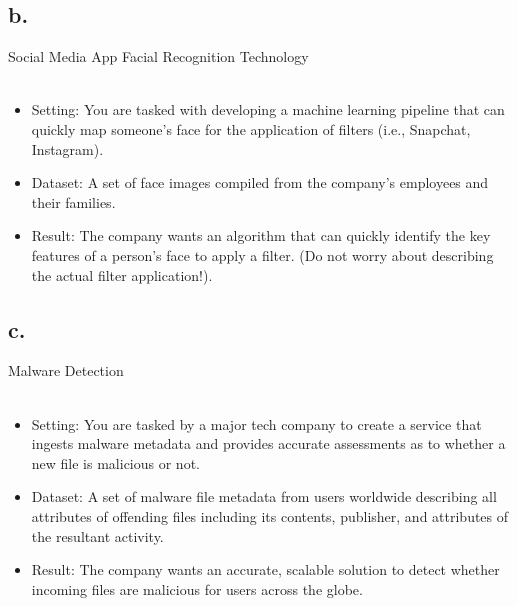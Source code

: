 \documentclass{article}
\newcommand{\1}{\mathbf{1}}
\begin{document}
{\subsection*{b.}

Social Media App Facial Recognition Technology \\ \\
\begin{itemize}
    \item Setting: You are tasked with developing a machine learning pipeline that can quickly map someone’s face for the application of filters (i.e., Snapchat, Instagram).
    \item Dataset: A set of face images compiled from the company’s employees and their families.
    \item  Result: The company wants an algorithm that can quickly identify the key features of a person’s face to apply a filter. (Do not worry about describing the actual filter application!).
\end{itemize}

\subsection*{c.}

Malware Detection \\ \\
\begin{itemize}
    \item Setting: You are tasked by a major tech company to create a service that ingests malware metadata and provides accurate assessments as to whether a new file is malicious or not.
    \item Dataset: A set of malware file metadata from users worldwide describing all attributes of offending files including its contents, publisher, and attributes of the resultant activity.
    \item Result: The company wants an accurate, scalable solution to detect whether incoming files are malicious for users across the globe.
\end{itemize}

}
\end{document}
